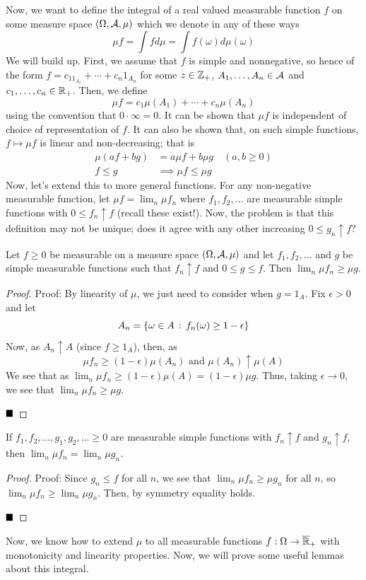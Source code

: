 Now, we want to define the integral of a real valued measurable function $f$ on some measure space $(\Omega, \cal{A}, \mu)$ which we denote in any of these ways
\[ \mu f = \int f d\mu = \int f(\omega) d\mu(\omega) \]
We will build up. First, we assume that $f$ is simple and nonnegative, so hence of the form $f = c_11_{A_1} + \cdots + c_n1_{A_n}$ for some $z \in \Z_{+}$, $A_1, \ldots, A_n \in \cal{A}$ and $c_1, \ldots, c_n \in \R_{+}$. Then, we define
\[ \mu f = c_1\mu(A_1) + \cdots + c_n\mu(A_n) \]
using the convention that $0 \cdot \infty = 0$. It can be shown that $\mu f$ is independent of choice of representation of $f$. It can also be shown that, on such simple functions, $f \mapsto \mu f$ is linear and non-decreasing; that is
\begin{align*}
    \mu(af + bg) &= a\mu f + b\mu g\quad (a, b \geq 0)\\
    f \leq g &\implies \mu f \leq \mu g
\end{align*}
Now, let's extend this to more general functions. For any non-negative measurable function, let $\mu f = \lim_{n} \mu f_n$ where $f_1, f_2, \ldots$ are measurable simple functions with $0 \leq f_n \uparrow f$ (recall these exist!). Now, the problem is that this definition may not be unique; does it agree with any other increasing $0 \leq g_n \uparrow f$?\\

\begin{lemma}
    Let $f \geq 0$ be measurable on a measure space $(\Omega, \cal{A}, \mu)$ and let $f_1, f_2, \ldots$ and $g$ be simple measurable functions such that $f_n \uparrow f$ and $0 \leq g \leq f$. Then $\lim_{n} \mu f_n \geq \mu g$. 
\end{lemma}
\begin{proof}{Proof:}
    By linearity of $\mu$, we just need to consider when $g = 1_{A}$. Fix $\epsilon > 0$ and let
    \[ A_n = \{\omega \in A \col f_{n}(\omega) \geq 1 - \epsilon\} \]
    Now, as $A_n \uparrow A$ (since $f \geq 1_{A}$), then, as
    \[ \mu f_n \geq (1 - \epsilon)\mu(A_n) \text{ and } \mu(A_n) \uparrow \mu(A) \]
    We see that as $\lim_{n} \mu f_n \geq (1 - \epsilon)\mu(A) = (1 - \epsilon)\mu g$. Thus, taking $\epsilon \to 0$, we see that $\lim_{n} \mu f_n \geq \mu g$. 

    $\qed$
\end{proof}

\begin{lemma}
    If $f_1, f_2, \ldots, g_1, g_2, \ldots \geq 0$ are measurable simple functions with $f_n \uparrow f$ and $g_n \uparrow f$, then $\lim_{n} \mu f_n = \lim_{n} \mu g_n$.
\end{lemma}
\begin{proof}{Proof:}
    Since $g_n \leq f$ for all $n$, we see that $\lim_{n} \mu f_n \geq \mu g_n$ for all $n$, so $\lim_{n} \mu f_n \geq \lim_{n} \mu g_n$. Then, by symmetry equality holds.

    $\qed$
\end{proof}
Now, we know how to extend $\mu$ to all measurable functions $f : \Omega \to \overline{\R}_{+}$ with monotonicity and linearity properties. Now, we will prove some useful lemmas about this integral.\\

